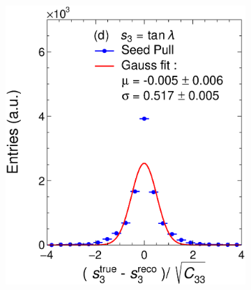 \begin{figure}[t]
\begin{subfigure}{0.32\textwidth}
         \caption{}
         \label{fig:resp2Seed_GArLite_ILRM+KF}
     \end{subfigure}
          \begin{subfigure}{0.32\textwidth}
         \centering
         \includegraphics[width=\textwidth]{figures/ch4-KF_NDGArLite/MC/ILRM+KF/UnitSeed_p3.eps}
         \caption{}
         \label{fig:resp3Seed_GArLite_ILRM+KF}
     \end{subfigure}
     \begin{subfigure}{0.32\textwidth}
         \centering

\end{subfigure}
\end{figure}
